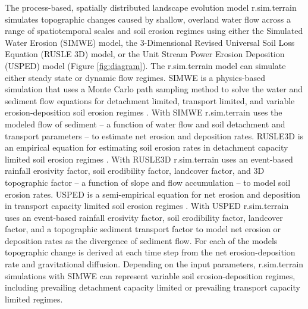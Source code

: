 \documentclass[gmd, manuscript]{copernicus}
\begin{document}
The process-based, spatially distributed 
landscape evolution model r.sim.terrain
simulates topographic changes
caused by shallow, overland water flow
across a range of spatiotemporal scales and soil erosion regimes
using either
the Simulated Water Erosion (SIMWE) model, 
the 3-Dimensional Revised Universal Soil Loss Equation (RUSLE 3D) model,
or the Unit Stream Power Erosion Deposition (USPED) model (Figure \ref {fig:diagram}).  
The r.sim.terrain model
can simulate either steady state or dynamic flow regimes.
SIMWE is a physics-based simulation
that uses a Monte Carlo path sampling method
to solve the water and sediment flow equations
for detachment limited, transport limited, and variable erosion-deposition 
soil erosion regimes 
\citep{Mitas1998,Mitasova2004}. 
With SIMWE 
r.sim.terrain
uses the modeled flow of sediment 
-- a function of water flow and soil detachment and transport parameters -- 
to estimate net erosion and deposition rates. 
RUSLE3D is an empirical equation for estimating soil erosion rates
in detachment capacity limited soil erosion regimes 
\citep{Mitasova1996,Mitasova2013}. 
%
With RUSLE3D r.sim.terrain
uses an event-based rainfall erosivity factor, 
soil erodibility factor, landcover factor, and 3D topographic factor
-- a function of slope and flow accumulation --
to model soil erosion rates. 
USPED is a semi-empirical equation for net erosion and deposition 
in transport capacity limited soil erosion regimes 
\citep{Mitasova1996,Mitasova2013}. 
With USPED r.sim.terrain uses an event-based rainfall erosivity factor, 
soil erodibility factor, landcover factor, and a topographic sediment transport factor
to model net erosion or deposition rates as the divergence of sediment flow. 
For each of the models 
topographic change is derived at each time step
from the net erosion-deposition rate
and gravitational diffusion.
Depending on the input parameters, 
r.sim.terrain simulations with SIMWE 
can represent variable soil erosion-deposition regimes, 
including prevailing detachment capacity limited 
or prevailing transport capacity limited regimes.
\end{document}
